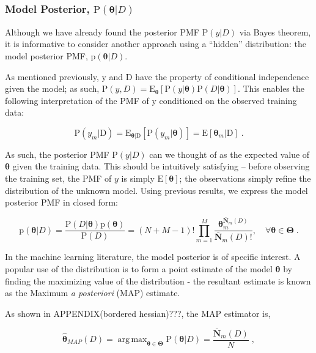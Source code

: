 \documentclass[12pt]{article}
\DeclareMathOperator*{\argmax}{arg\,max}
\begin{document}
\subsubsection{Model Posterior, $\text{P}(\bm{\theta} | D)$}

Although we have already found the posterior PMF $\text{P}(y | D)$ via Bayes theorem, it is informative to consider another approach using a ``hidden'' distribution: the model posterior PMF, $\text{p}(\bm{\theta} | D)$. 

As mentioned previously, $\mathrm{y}$ and $\mathrm{D}$ have the property of conditional independence given the model; as such, $\text{P}(y,D) = \text{E}_{\bm{\theta}} \left[ \text{P}(y | \bm{\theta}) \text{P}(D | \bm{\theta}) \right]$. This enables the following interpretation of the PMF of $\mathrm{y}$ conditioned on the observed training data:

\begin{equation}
\text{P}(y_m | \mathrm{D}) = \text{E}_{\bm{\theta} | \mathrm{D}} \left[ \text{P}(y_m|\bm{\theta}) \right] = \text{E}\left[ \bm{\theta}_m | \mathrm{D} \right] \;.
\end{equation}

As such, the posterior PMF $\text{P}(y | D)$ can we thought of as the expected value of $\bm{\theta}$ given the training data. This should be intuitively satisfying -- before observing the training set, the PMF of $y$ is simply $\text{E}[\bm{\theta}]$; the observations simply refine the distribution of the unknown model. Using previous results, we express the model posterior PMF in closed form:

\begin{equation}
\text{p}(\bm{\theta} | D) = \frac{\text{P}(D | \bm{\theta}) \text{p}(\bm{\theta})}{\text{P}(D)}
= (N+M-1)! \prod_{m=1}^M \frac{\bm{\theta}_m^{\bar{\bm{N}}_m(D)}}{\bar{\bm{N}}_m(D)!} ,  \quad  \forall \bm{\theta} \in \bm{\Theta} \;.
\end{equation}


In the machine learning literature, the model posterior is of specific interest. A popular use of the distribution is to form a point estimate of the model $\bm{\theta}$ by finding the maximizing value of the distribution - the resultant estimate is known as the Maximum \emph{a posteriori} (MAP) estimate. 

As shown in APPENDIX(bordered hessian)???, the MAP estimator is,

\begin{equation}
\hat{\bm{\theta}}_{MAP}(D) = \argmax_{\bm{\theta} \in \bm{\Theta}} \text{P}(\bm{\theta} | D) = \frac{\bar{\bm{N}}_m(D)}{N} \;,
\end{equation}
\end{document}
